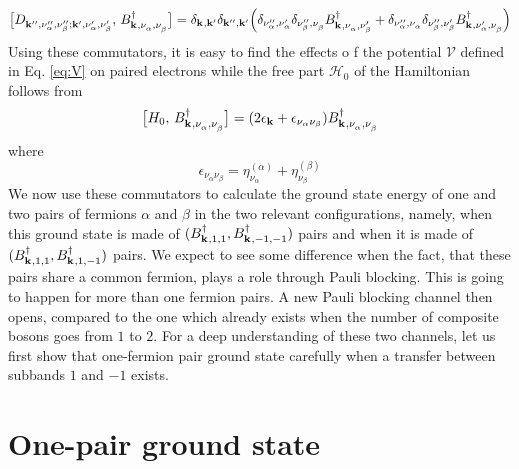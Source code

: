\documentclass[11pt]{article} %
\begin{document}
\begin{equation}\label{eq:db}
\big[D^{}_{\mathbf{k}^{{\prime}{\prime} },\nu_{\alpha}^{{\prime}{\prime}},\nu_{\beta}^{{\prime}{\prime}};\mathbf{k}^{{\prime} },\nu_{\alpha}^{{\prime}},\nu_{\beta}^{{\prime}}},\,B^{\dagger}_{\mathbf{k}^{ },\nu_{\alpha}^{},\nu_{\beta}^{}}\big]=
	\delta_{\mathbf{k}^{ },\mathbf{k}^{{\prime}}}\delta_{\mathbf{k}^{{\prime}{\prime} },\mathbf{k}^{{\prime}}}
	\Big(\delta_{\nu_{\alpha}^{{\prime}{\prime}},\nu_{\alpha}^{{\prime}}}\delta_{\nu_{\beta}^{{\prime}{\prime}},\nu_{\beta}^{}}B^{\dagger}_{\mathbf{k}^{ },\nu_{\alpha}^{},\nu_{\beta}^{{\prime}}}+
	\delta_{\nu_{\alpha}^{{\prime}{\prime}},\nu_{\alpha}^{}}\delta_{\nu_{\beta}^{{\prime}{\prime}},\nu_{\beta}^{{\prime}}}B^{\dagger}_{\mathbf{k}^{ },\nu_{\alpha}^{{\prime}},\nu_{\beta}^{}}\Big)
\end{equation}
Using these commutators, it is easy to find the effects o f the potential $\mathcal{V}$ defined in Eq. \ref{eq:V} on paired electrons while the free part $\mathcal{H}_0$ of the Hamiltonian follows from
\begin{equation}\label{eq:h0B}
\big[H_0,\,B^{\dagger}_{\mathbf{k}^{ },\nu_{\alpha}^{},\nu_{\beta}^{}}\big]=
	(2\epsilon_{\mathbf{k}}+\epsilon_{\nu_{\alpha}\nu_{\beta}})B^{\dagger}_{\mathbf{k}^{ },\nu_{\alpha}^{},\nu_{\beta}^{}}
\end{equation}
where 
\begin{equation}
\epsilon_{\nu_{\alpha}\nu_{\beta}}=\eta_{\nu_{\alpha}}^{(\alpha)}+\eta_{\nu_{\beta}}^{(\beta)}
\end{equation}
We now use these commutators to calculate the ground state energy of one and two pairs of fermions $\alpha$ and $\beta$ in the two relevant configurations, namely, when this ground state is made of $(B^{\dagger}_{\mathbf{k}^{ },1,1}, B^{\dagger}_{\mathbf{k}^{ },-1,-1})$ pairs and when it is made of $(B^{\dagger}_{\mathbf{k}^{ },1,1}, B^{\dagger}_{\mathbf{k}^{ },1,-1})$ pairs. We expect to see some difference when the fact, that these pairs share a common fermion, plays a role through Pauli blocking.  This is going to happen for more than one fermion pairs.  A new Pauli blocking channel then opens, {compared} to the one which already exists when the number of composite bosons goes from $1$ to $2$.  For a deep understanding of these two channels, let us first show that one-fermion pair ground state carefully when a transfer between subbands $1$ and $-1$ exists. 

\section{One-pair ground state\label{sec:one}}
\end{document}
